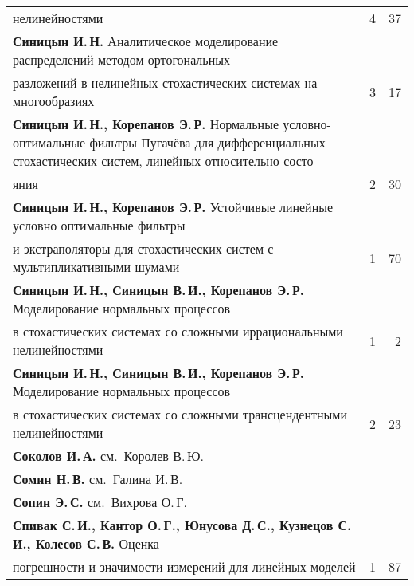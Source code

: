 {\begin{tabular}{p{388pt}rr}
нелинейностями&4&37\\[-.35pt]
\textbf{Синицын И.\,Н.} Аналитическое моделирование распределений
методом ортогональных\linebreak
\\[-12pt]
\hspace*{21pt}разложений в нелинейных стохастических сис\-те\-мах на
многообразиях&3&17\\[-.35pt]
\hangindent=21pt\noindent\textbf{Синицын И.\,Н., Корепанов Э.\,Р.} Нормальные
условно-оптимальные фильтры Пугачёва для дифференциальных стохастических сис\-тем,
линейных относительно состо-\linebreak
\\[-12pt]
\hspace*{21pt}яния&2&30\\[-.35pt]
\textbf{Синицын И.\,Н., Корепанов Э.\,Р.} Устойчивые линейные условно
оптимальные фильтры\linebreak
\\[-12pt]
\hspace*{21pt}и экстраполяторы для стохастических сис\-тем с
мультипликативными шумами&1&70\\[-.35pt]
\textbf{Синицын И.\,Н., Синицын В.\,И., Корепанов Э.\,Р.}
Моделирование нормальных процессов\linebreak
\\[-12pt]
\hspace*{21pt}в стохастических сис\-те\-мах со сложными
иррациональными нелинейностями&1&2\\[-.35pt]
\textbf{Синицын И.\,Н., Синицын В.\,И., Корепанов Э.\,Р.}
Моделирование нормальных процессов\linebreak
\\[-12pt]
\hspace*{21pt}в стохастических сис\-те\-мах со сложными
трансцендентными нелинейностями&2&23\\[-.35pt]
\textbf{Соколов И.\,А.} см.\ Королев В.\,Ю.&&\\[-.35pt]
\textbf{Сомин Н.\,В.} см.\ Галина И.\,В.&&\\[-.35pt]
\textbf{Сопин Э.\,С.} см.\ Вихрова О.\,Г.&&\\[-.35pt]
\textbf{Спивак С.\,И., Кантор О.\,Г., Юнусова Д.\,С., Кузнецов С.\,И.,
Колесов С.\,В.} Оценка\linebreak
\\[-12pt]
\hspace*{21pt}погрешности и значимости измерений для линейных
моделей&1&87\\[-.35pt]

\end{tabular}}

